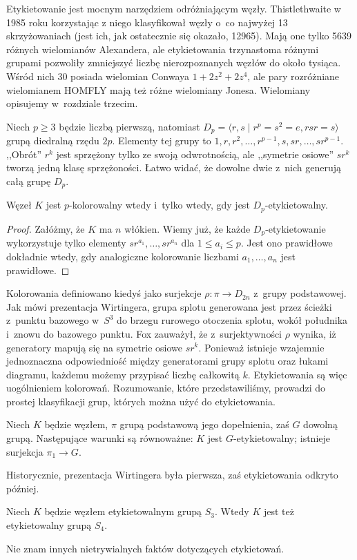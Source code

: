 Etykietowanie jest mocnym narzędziem odróżniającym węzły.
Thistlethwaite w 1985 roku korzystając z niego klasyfikował węzły o~co najwyżej 13 skrzyżowaniach (jest ich, jak ostatecznie się okazało, 12965).
Mają one tylko 5639 różnych wielomianów Alexandera, ale etykietowania trzynastoma różnymi grupami pozwoliły zmniejszyć liczbę nierozpoznanych węzłów do około tysiąca.
Wśród nich 30 posiada wielomian Conwaya $1 + 2z^2 + 2z^4$, ale pary rozróżniane wielomianem HOMFLY mają też różne wielomiany Jonesa.
Wielomiany opisujemy w~rozdziale trzecim.

Niech $p \ge 3$ będzie liczbą pierwszą, natomiast $D_p = \langle r, s \mid r^p = s^2 = e, rsr = s \rangle$ grupą diedralną rzędu $2p$.
Elementy tej grupy to $1, r, r^2, \ldots, r^{p-1}, s, sr, \ldots, sr^{p-1}$.
,,Obrót'' $r^k$ jest sprzężony tylko ze swoją odwrotnością, ale ,,symetrie osiowe'' $sr^k$ tworzą jedną klasę sprzężoności.
Łatwo widać, że dowolne dwie z~nich generują całą grupę $D_p$.

\begin{proposition}
    Węzeł $K$ jest $p$-kolorowalny wtedy i~tylko wtedy, gdy jest $D_p$-etykietowalny.
\end{proposition}

\begin{proof}
    Załóżmy, że $K$ ma $n$ włókien.
    Wiemy już, że każde $D_p$-etykietowanie wykorzystuje tylko elementy $sr^{a_1}, \ldots, sr^{a_n}$ dla $1 \le a_i \le p$.
    Jest ono prawidłowe dokładnie wtedy, gdy analogiczne kolorowanie liczbami $a_1, \ldots, a_n$ jest prawidłowe.
\end{proof}

Kolorowania definiowano kiedyś jako surjekcje $\rho \colon \pi \to D_{2n}$ z~grupy podstawowej.
Jak mówi prezentacja Wirtingera, grupa splotu generowana jest przez ścieżki z~punktu bazowego w~$S^3$ do brzegu rurowego otoczenia splotu, wokół południka i~znowu do bazowego punktu.
Fox zauważył, że z~surjektywności $\rho$ wynika, iż generatory mapują się na symetrie osiowe $sr^k$.
Ponieważ istnieje wzajemnie jednoznaczna odpowiedniość między generatorami grupy splotu oraz łukami diagramu, każdemu możemy przypisać liczbę całkowitą $k$.
Etykietowania są więc uogólnieniem kolorowań.
Rozumowanie, które przedstawiliśmy, prowadzi do prostej klasyfikacji grup, których można użyć do etykietowania.

\begin{proposition}
    Niech $K$ będzie węzłem, $\pi$ grupą podstawową jego dopełnienia, zaś $G$ dowolną grupą.
    Następujące warunki są równoważne: $K$ jest $G$-etykietowalny; istnieje surjekcja $\pi_1 \to G$.
\end{proposition}

Historycznie, prezentacja Wirtingera była pierwsza, zaś etykietowania odkryto później.

\begin{proposition}[Perko]
    Niech $K$ będzie węzłem etykietowalnym grupą $S_3$.
    Wtedy $K$ jest też etykietowalny grupą $S_4$.
\end{proposition}

Nie znam innych nietrywialnych faktów dotyczących etykietowań.

